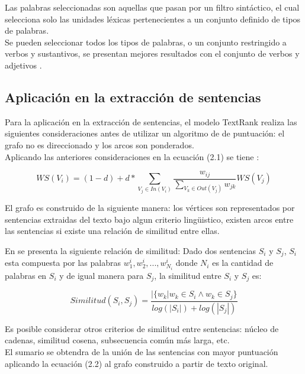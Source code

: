Las palabras seleccionadas son aquellas que pasan por un filtro sint\'actico, el cual
selecciona solo las unidades l\'exicas pertenecientes a un conjunto definido de tipos
de palabras. \\

Se pueden seleccionar todos los tipos de palabras, o un conjunto restringido a verbos
y sustantivos, se presentan mejores resultados con el conjunto de verbos y
adjetivos \cite{RMPT04} .

\subsection{Aplicaci\'on en la extracci\'on de sentencias} 
Para la aplicaci\'on en la extracci\'on de sentencias, el modelo TextRank realiza
las siguientes consideraciones antes de utilizar un algoritmo de de puntuaci\'on:
el grafo no es direccionado y los arcos son ponderados. \\

Aplicando las anteriores consideraciones en la ecuaci\'on (2.1) se tiene
\cite{RMPT04}:

\begin{equation}
	WS(V_i) = (1 - d) + d *
	\sum_{V_j\in In(V_i)}{\frac{w_{ij}}{\sum_{V_k\in Out(V_j)}{w_{jk}}}WS(V_j)}
\end{equation}

El grafo es construido de la siguiente manera: los v\'ertices son representados por
sentencias extraidas del texto bajo algun criterio ling\"uistico, existen arcos
entre las sentencias si existe una relaci\'on de similitud entre ellas.

En \cite{RMPT04} se presenta la siguiente relaci\'on de similitud: Dado dos
sentencias $S_i$ y $S_j$, $S_i$ esta compuesta por las palabras 
$w^i_1,w^i_2,...,w^i_{N_i}$ donde $N_i$ es la cantidad de palabras en $S_i$ y de igual
manera para $S_j$, la similitud entre $S_i$ y $S_j$ es:

\begin{equation}
	Similitud(S_i, S_j) = 
	\frac{|\{w_k|w_k\in S_i \wedge w_k\in S_j\}}{log(|S_i|)+log(|S_j|)}
\end{equation}

Es posible considerar otros criterios de similitud entre sentencias: n\'ucleo de
cadenas, similitud cosena, subsecuencia com\'un m\'as larga, etc. \\

El sumario se obtendra de la uni\'on de las sentencias con mayor puntuaci\'on
aplicando la ecuaci\'on (2.2) al grafo construido a partir de texto original.
